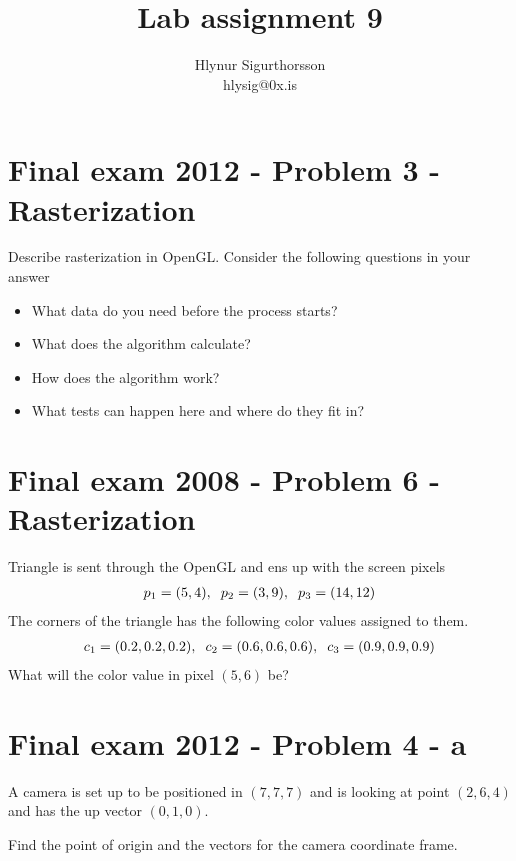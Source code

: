 \documentclass[12pt]{article}
\title{\textbf{Lab assignment 9}}
\date{}
\author{Hlynur Sigurthorsson\\hlysig@0x.is}
\begin{document}
\maketitle
\thispagestyle{empty}
\section*{Final exam 2012 - Problem 3 - Rasterization}
Describe rasterization in OpenGL. Consider the following questions in your answer
\begin{itemize}
\item What data do you need before the process starts?
\item What does the algorithm calculate?
\item How does the algorithm work?
\item What tests can happen here and where do they fit in?
\end{itemize}


\section*{Final exam 2008 - Problem 6 - Rasterization}
Triangle is sent through the OpenGL and ens up with the screen pixels
\begin{eqnarray*}
p_1 = (5,4), \hspace{0.2cm} p_2 = (3,9),\hspace{0.2cm} p_3 = (14,12)
\end{eqnarray*}
The corners of the triangle has the following color values assigned to them.
\begin{eqnarray*}
c_1 = (0.2,0.2,0.2), \hspace{0.2cm} c_2 = (0.6, 0.6, 0.6),\hspace{0.2cm} c_3 = (0.9, 0.9, 0.9)
\end{eqnarray*}
What will the color value in pixel $(5,6)$ be?


\section*{Final exam 2012 - Problem 4 - a}
A camera is set up to be positioned in $(7,7,7)$ and is looking at point $(2,6,4)$ and has
the up vector $(0,1,0)$.

Find the point of origin and the vectors for the camera coordinate frame.
\end{document}
